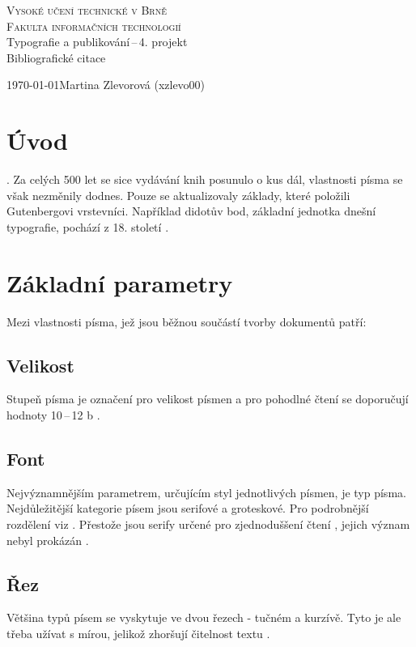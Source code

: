 \documentclass[11pt, a4paper]{article}
\begin{document}
\begin{titlepage}
\begin{center}
\textsc{{\Huge Vysoké učení technické v Brně\\}
        {\huge Fakulta informačních technologií\\}}
{\LARGE Typografie a publikování\,--\,4. projekt\\}
{\Huge Bibliografické citace\\}
\end{center}
\lineskip=1pt
{\large \today \hfill Martina Zlevorová (xzlevo00)}
\end{titlepage}

\section{Úvod}
\emph{} \cite{Gorecka2012}. Za celých 500 let se sice vydávání knih posunulo o kus dál, vlastnosti písma se však nezměnily dodnes. Pouze se aktualizovaly základy, které položili Gutenbergovi vrstevníci. Například didotův bod, základní jednotka dnešní typografie, pochází z 18. století \cite{Bures2002}.
\section{Základní parametry}
Mezi vlastnosti písma, jež jsou běžnou součástí tvorby dokumentů patří:
\subsection{Velikost}
Stupeň písma je označení pro velikost písmen a pro pohodlné čtení se doporučují hodnoty 10\,--\,12 b \cite{Rybicka2003}.
\subsection{Font}
Nejvýznamnějším parametrem, určujícím styl jednotlivých písmen, je typ písma. Nejdůležitější kategorie písem jsou serifové a groteskové. Pro podrobnější rozdělení viz \cite{Sirucek2007}. Přestože jsou serify určené pro zjednoduššení čtení \cite{Jiricek2012}, jejich význam nebyl prokázán \cite{Arditi2005}.
\subsection{Řez}
Většina typů písem se vyskytuje ve dvou řezech - tučném a kurzívě. Tyto je ale třeba užívat s mírou, jelikož zhoršují čitelnost textu \cite{Danna2018}.
\end{document}
